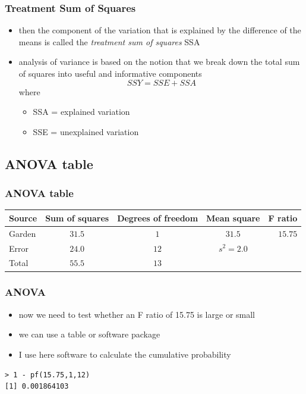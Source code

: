 \begin{frame}\frametitle{Treatment Sum of Squares}
\begin{itemize}
  \item then the component of the variation that is explained by the difference of the means is called the \emph{treatment sum of squares} SSA
  \item analysis of variance is based  on the notion that we break down the total sum of squares into useful and informative components
$$SSY=SSE+SSA$$ where
    \begin{itemize}
      \item SSA = explained variation
      \item SSE = unexplained variation
    \end{itemize}

  \end{itemize}
\end{frame}


\subsection{ANOVA table}

\begin{frame}\frametitle{ANOVA table}
\begin{center}
\small
\begin{tabular}{@{} >{\ttfamily}l cccr}
\hline
Source & Sum of squares & Degrees of freedom & Mean square & F ratio \\
\hline
Garden &  $31.5$ & $1$ &  $31.5$ &  $15.75$\\
Error &  $24.0$ & $12$ &  $s^2=2.0$ &  \\
Total & $55.5$ & $13$ & & \\   \hline
\end{tabular}
\end{center}
\end{frame}


\begin{frame}[fragile]\frametitle{ANOVA}
  \begin{itemize}
  \item now we need to test whether an F ratio of 15.75 is large or small
  \item we can use a table or software package
  \item I use here software to calculate the cumulative probability
  \end{itemize}
\begin{verbatim}
> 1 - pf(15.75,1,12)
[1] 0.001864103
\end{verbatim}
\end{frame}

